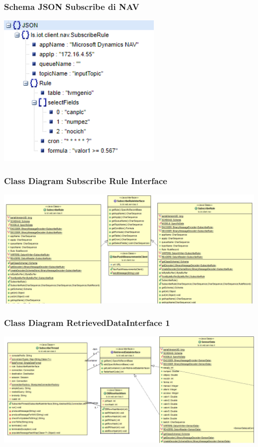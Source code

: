 \documentclass{beamer}
\begin{document}
\begin{frame}
\frametitle{Schema JSON Subscribe di NAV}
\includegraphics[width=0.6\textwidth]{images/subscribe-json-2.png}
\end{frame}

\begin{frame}
\frametitle{Class Diagram Subscribe Rule Interface}
\includegraphics[width=1\textwidth]{images/ClassDiagram7.png}
\end{frame}

\begin{frame}
\frametitle{Class Diagram RetrievedDataInterface 1}
\includegraphics[width=1\textwidth]{images/ClassDiagram2.png}
\end{frame}
\end{document}
